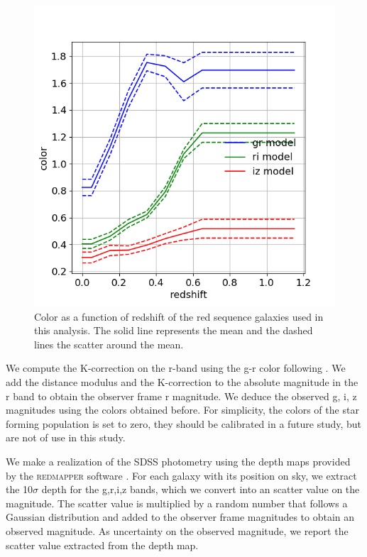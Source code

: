 \documentclass[fleqn,usenatbib,onecolumn]{mnras}
\begin{document}
\begin{figure}
\centering
\includegraphics[width=.85\columnwidth,type=png,ext=.png,read=.png]{figures/red_sequence}
\caption{\label{fig:optical:RS:model} Color as a function of redshift of the red sequence galaxies used in this analysis. The solid line represents the mean and the dashed lines the scatter around the mean. }
\end{figure}

We compute the K-correction on the r-band using the g-r color following \citet{2010MNRAS.405.1409C,2012MNRAS.419.1727C}. 
We add the distance modulus and the K-correction to the absolute magnitude in the r band to obtain the observer frame r magnitude. 
We deduce the observed g, i, z magnitudes using the colors obtained before. 
For simplicity, the colors of the star forming population is set to zero, they should be calibrated in a future study, but are not of use in this study. 

We make a realization of the SDSS photometry using the depth maps provided by the \textsc{redmapper} software \citep{2014ApJ...785..104R,2015MNRAS.453...38R}. 
For each galaxy with its position on sky, we extract the 10$\sigma$ depth for the g,r,i,z bands, which we convert into an scatter value on the magnitude. 
The scatter value is multiplied by a random number that follows a Gaussian distribution and added to the observer frame magnitudes to obtain an observed magnitude. 
As uncertainty on the observed magnitude, we report the scatter value extracted from the depth map. 
\end{document}
